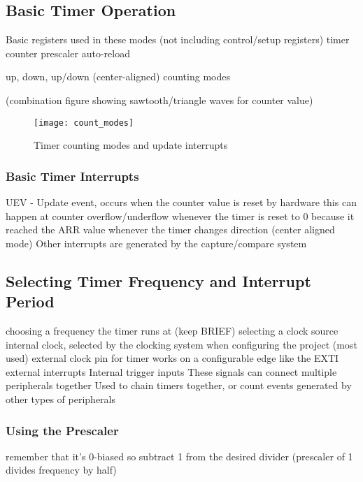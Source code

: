 \documentclass[11pt,fleqn]{book} %
\begin{document}
    \subsection{Basic Timer Operation}
    
    Basic registers used in these modes (not including control/setup registers)
        timer counter
        prescaler 
        auto-reload
    
    up, down, up/down (center-aligned) counting modes
    
    (combination figure showing sawtooth/triangle waves for counter value)
    \begin{figure}[]
        \centering\texttt{[image: count\_modes]}
        \caption{Timer counting modes and update interrupts}
        \label{count_modes}
    \end{figure}
    
    \subsubsection{Basic Timer Interrupts}
    UEV - Update event, occurs when the counter value is reset by hardware
        this can happen at counter overflow/underflow
        whenever the timer is reset to 0 because it reached the ARR value
        whenever the timer changes direction (center aligned mode)
    Other interrupts are generated by the capture/compare system
    
    \subsection{Selecting Timer Frequency and Interrupt Period}	
    choosing a frequency the timer runs at (keep BRIEF)
    selecting a clock source
        internal clock, selected by the clocking system when configuring the project (most used)
        external clock pin for timer
            works on a configurable edge like the EXTI external interrupts
        Internal trigger inputs
            These signals can connect multiple peripherals together
            Used to chain timers together, or count events generated by other types of peripherals
    
    \subsubsection{Using the Prescaler}
        remember that it's 0-biased so subtract 1 from the desired divider
        (prescaler of 1 divides frequency by half)
    
\end{document}
